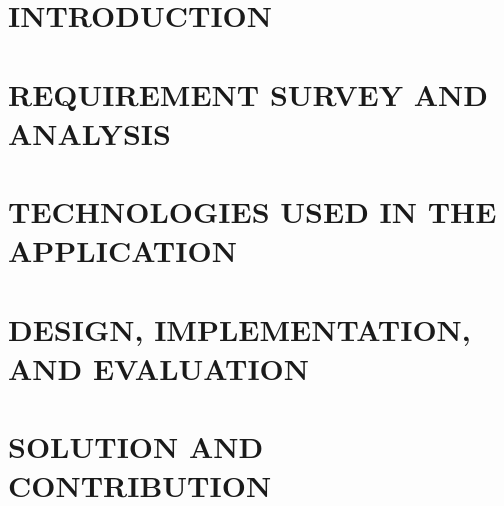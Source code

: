 ﻿\documentclass[a4paper,13pt,3p,twoside]{report}
\theoremstyle{definition}
\begin{document}
\renewcommand{\listtablename}{LIST OF TABLES}
{\let\oldnumberline\numberline
\renewcommand{\numberline}{Table~\oldnumberline}
\listoftables}

\glsaddall 
\renewcommand*{\acronymname}{LIST OF ABBREVIATIONS}
\renewcommand*{\entryname}{Abbreviation}
\renewcommand*{\descriptionname}{Full~Expression}
\printnoidxglossaries

% 

% 


\newpage
{}

\pagestyle{fancy}
\fancyhf{}
\fancyhead[RE, LO]{\leftmark}
\fancyfoot[RE, LO]{\thepage}

\chapter{INTRODUCTION}
\label{chapter:Introduction}

\newpage
\chapter{REQUIREMENT SURVEY AND ANALYSIS}
\label{chapter:Related_works}



\newpage
\chapter{TECHNOLOGIES USED IN THE APPLICATION}
\label{chapter:Methodology}


\newpage
\chapter{DESIGN, IMPLEMENTATION, AND EVALUATION}
\label{chapter:Experiment}


\newpage
\chapter{SOLUTION AND CONTRIBUTION}
\label{chapter:SolutionAndContribution}

\newpage
\end{document}
